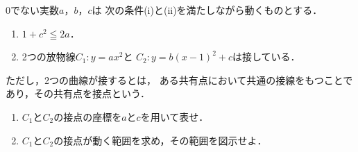 \documentclass[../../main.tex]{subfiles}
\begin{document}
0でない実数$a$，$b$，$c$は
次の条件(i)と(ii)を満たしながら動くものとする．
\begin{enumerate}
  \item$1+c^2\leqq2a$．
  \item2つの放物線$C_1:y=ax^2$と
    $C_2:y=b{(x-1)}^2+c$は接している．
\end{enumerate}
ただし，2つの曲線が接するとは，
ある共有点において共通の接線をもつことであり，その共有点を接点という．
\begin{enumerate}
  \item$C_1$と$C_2$の接点の座標を$a$と$c$を用いて表せ．
  \item$C_1$と$C_2$の接点が動く範囲を求め，その範囲を図示せよ．
\end{enumerate}
\end{document}

